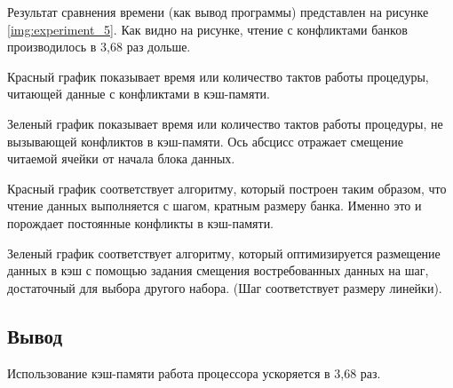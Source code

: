 \begin{figure}[H]
\end{figure}

Результат сравнения времени (как вывод программы) представлен на рисунке \ref{img:experiment_5}. Как видно на рисунке, чтение с конфликтами банков производилось в 3,68 раз дольше.

Красный график показывает время или количество тактов работы процедуры, читающей данные с конфликтами в кэш-памяти. 

Зеленый график показывает время или количество тактов работы процедуры, не вызывающей конфликтов в кэш-памяти. Ось абсцисс отражает смещение читаемой ячейки от начала блока данных.

Красный график соответствует алгоритму, который построен таким образом, что чтение данных выполняется с шагом, кратным размеру банка. Именно это и порождает постоянные конфликты в кэш-памяти.

Зеленый график соответствует алгоритму, который оптимизируется размещение данных в кэш с помощью задания смещения востребованных данных на шаг, достаточный для выбора другого набора. (Шаг соответствует размеру линейки).

\subsection*{Вывод}
Использование кэш-памяти работа процессора ускоряется в 3,68 раз.